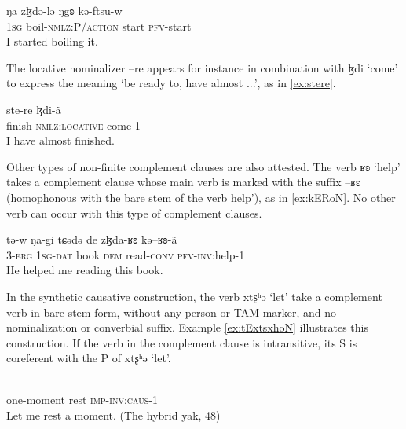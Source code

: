 \documentclass[oneside,a4paper,11pt]{article}
\newcommand{\ipa}[1]{{\phon #1}} %
\begin{document}
\begin{exe}
\ex \label{ex:btsugs}
\gll 
\ipa{ŋa} 	\ipa{zɮdə-lə} 	\ipa{ŋgʚ} 	\ipa{kə-ftsu-w} \\
\textsc{1sg} boil-\textsc{nmlz:P/action} start \textsc{pfv}-start \\
\glt I started boiling it.
\end{exe}

The locative nominalizer \ipa{--re} appears for instance in combination with \ipa{ɮdi} `come' to express the meaning `be ready to, have almost ...', as in \ref{ex:stere}.

\begin{exe}
\ex \label{ex:stere}
\gll 
 \ipa{ste-re} 	\ipa{ɮdi-ã} \\
finish-\textsc{nmlz:locative} come-1 \\
\glt I have almost finished.
\end{exe}



Other types of non-finite complement clauses are also attested. The verb \ipa{ʁʚ}  `help' takes a complement clause  whose main verb is marked with the suffix \ipa{--ʁʚ} (homophonous with the bare stem of the verb  help'), as in \ref{ex:kERoN}. No other verb can occur with this type of complement clauses.

\begin{exe}
\ex \label{ex:kERoN}
\gll 
\ipa{tə-w} 	\ipa{ŋa-gi} 	\ipa{tɕədə} 	\ipa{de} 	\ipa{zɮda-ʁʚ} 	\ipa{kə--ʁʚ-ã} \\
\textsc{3-erg} \textsc{1sg-dat} book \textsc{dem} read-\textsc{conv} \textsc{pfv-inv:}help-1 \\
\glt He helped me reading this book.
\end{exe}


In the synthetic causative construction, the verb \ipa{xtʂʰə} `let' take a complement verb in bare stem form, without any person or TAM marker, and no nominalization or converbial suffix. Example \ref{ex:tExtsxhoN} illustrates this construction. If the verb in the complement clause is intransitive, its S is coreferent with the P of \ipa{xtʂʰə} `let'.

\begin{exe}
\ex \label{ex:tExtsxhoN}
\gll 
[\ipa{e-ʑe} 	\ipa{nə}] 	\ipa{tə-xtʂʰə-ã} \\
one-moment rest \textsc{imp-inv:caus}-1 \\
\glt Let me rest a moment. (The hybrid yak, 48)
\end{exe}
\end{document}
